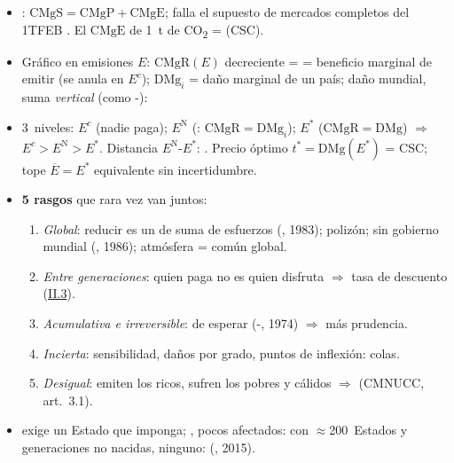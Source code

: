 \documentclass{article}
\begin{document}
\begin{columnas}
\begin{itemize}
\item {} : $\mathrm{CMgS}=\mathrm{CMgP}+\mathrm{CMgE}$; falla el supuesto de mercados completos del 1TFEB . El $\mathrm{CMgE}$ de 1~t de CO\textsubscript{2} =  (CSC).
\item Gráfico en emisiones $E$: $\mathrm{CMgR}(E)$ decreciente =  = beneficio marginal de emitir (se anula en $E^c$); $\mathrm{DMg}_i$ = daño marginal de un país; daño mundial, suma \emph{vertical} (como -):
\item 3~niveles: $E^c$ (nadie paga); $E^{\mathrm N}$ (: $\mathrm{CMgR}=\mathrm{DMg}_i$); $E^*$ ($\mathrm{CMgR}=\mathrm{DMg}$) $\Rightarrow$ $E^c>E^{\mathrm N}>E^*$. Distancia $E^{\mathrm N}$-$E^*$: . Precio óptimo $t^*=\mathrm{DMg}(E^*)$ = CSC; tope $\overline{E}=E^*$ equivalente sin incertidumbre.
\end{itemize}
\begin{itemize}
\item \textbf{5 rasgos} que rara vez van juntos:
\begin{enumerate}
\item \emph{Global}: reducir es un  de suma de esfuerzos (, 1983); polizón; sin gobierno mundial (, 1986); atmósfera = común global.
\item \emph{Entre generaciones}: quien paga no es quien disfruta $\Rightarrow$ tasa de descuento (\hyperref[rep:II.3]{II.3}).
\item \emph{Acumulativa e irreversible}:  de esperar (-, 1974) $\Rightarrow$ más prudencia.
\item \emph{Incierta}: sensibilidad, daños por grado, puntos de inflexión: colas.
\item \emph{Desigual}: emiten los ricos, sufren los pobres y cálidos $\Rightarrow$  (CMNUCC, art.~3.1).
\end{enumerate}
\item {} exige un Estado que imponga; , pocos afectados: con $\approx$200~Estados y generaciones no nacidas, ninguno:  (, 2015).
\end{itemize}


\end{columnas}
\end{document}
